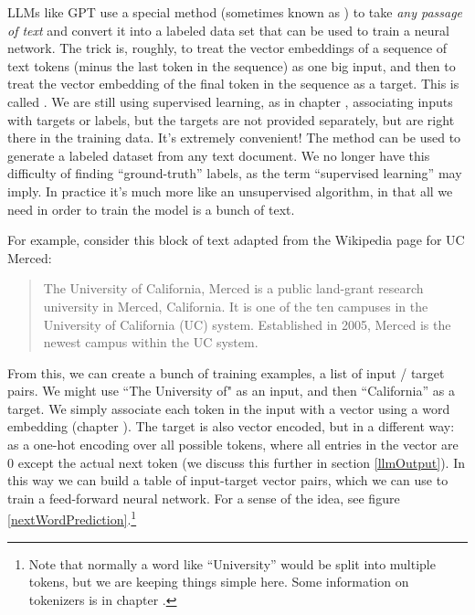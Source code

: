 LLMs like GPT use a special method (sometimes known as ) to take \emph{any passage of text} and convert it into a labeled data set that can be used to train a neural network. The trick is, roughly, to treat the vector embeddings of a sequence of text tokens (minus the last token in the sequence) as one big input, and then to treat the vector embedding of the final token in the sequence as a target. This is called .  We are still using supervised learning, as in chapter , associating inputs with targets or labels, but the targets are not provided separately, but are right there in the training data. It's extremely convenient!  The method can be used to generate a labeled dataset from any text document. We no longer have this difficulty of finding ``ground-truth'' labels, as the term ``supervised learning'' may imply. In practice it's much more like an unsupervised algorithm, in that all we need in order to train the model is a bunch of text. 

For example, consider this block of text adapted from the Wikipedia page for UC Merced:

\begin{quote}
The University of California, Merced is a public land-grant research university in Merced, California. It is one of the ten campuses in the University of California (UC) system. Established in 2005, Merced is the newest campus within the UC system.
\end{quote}

From this, we can create a bunch of training examples, a list of input / target pairs. We might use ``The University of" as an input, and then ``California'' as a target. We simply associate each token in the input with a vector using a word embedding (chapter ). The target is also vector encoded, but in a different way: as a one-hot encoding over all possible tokens, where all entries in the vector are 0 except the actual next token (we discuss this further in section \ref{llmOutput}). In this way we can build a table of input-target vector pairs, which we can use to train a feed-forward neural network. For a sense of the idea, see figure \ref{nextWordPrediction}.\footnote{Note that normally a word like ``University'' would be split into multiple tokens, but we are keeping things simple here. Some information on tokenizers is in chapter .} 

